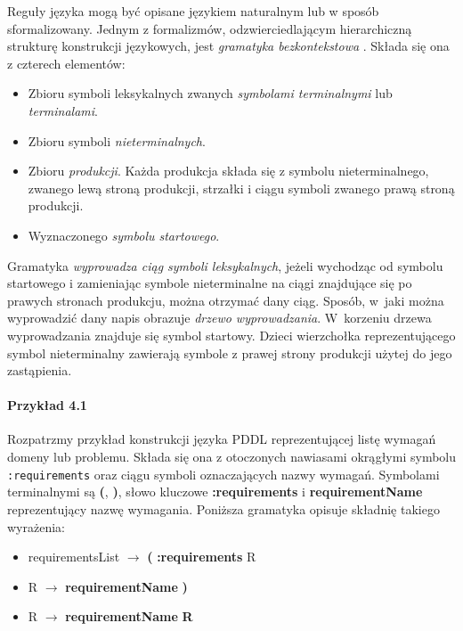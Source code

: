 Reguły języka mogą być opisane językiem naturalnym lub w sposób sformalizowany.
Jednym z formalizmów, odzwierciedlającym hierarchiczną strukturę konstrukcji językowych,
jest \emph{gramatyka bezkontekstowa} . Składa się ona z czterech elementów:

\begin{itemize}
\item Zbioru symboli leksykalnych zwanych \emph{symbolami terminalnymi} lub \emph{terminalami}.
\item Zbioru symboli \emph{nieterminalnych}.
\item Zbioru \emph{produkcji}. Każda produkcja składa się z symbolu nieterminalnego,
  zwanego lewą stroną produkcji, strzałki i ciągu symboli zwanego prawą stroną produkcji.
\item Wyznaczonego \emph{symbolu startowego}.
\end{itemize}

Gramatyka \emph{wyprowadza ciąg symboli leksykalnych}, jeżeli wychodząc 
od symbolu startowego i zamieniając symbole nieterminalne na ciągi znajdujące 
się po prawych stronach produkcju, można otrzymać dany ciąg. Sposób, w~jaki
można wyprowadzić dany napis obrazuje \emph{drzewo wyprowadzania}. W~korzeniu drzewa wyprowadzania
znajduje się symbol startowy. Dzieci wierzchołka reprezentującego symbol nieterminalny
zawierają symbole z prawej strony produkcji użytej do jego zastąpienia.

\paragraph{Przykład 4.1}
Rozpatrzmy przykład konstrukcji języka PDDL reprezentującej listę wymagań domeny lub problemu.
Składa się ona z otoczonych nawiasami okrągłymi symbolu \texttt{:requirements} oraz
ciągu symboli oznaczających nazwy wymagań. Symbolami terminalnymi są 
\textbf{(}, \textbf{)}, słowo kluczowe \textbf{:requirements} i 
\textbf{requirementName} reprezentujący nazwę wymagania. Poniższa gramatyka opisuje
składnię takiego wyrażenia:

\begin{itemize}
\item requirementsList $\rightarrow$ \textbf{(} \textbf{:requirements} R
\item R $\rightarrow$ \textbf{requirementName} \textbf{)}
\item R $\rightarrow$ \textbf{requirementName} \textbf{R}
\end{itemize}


